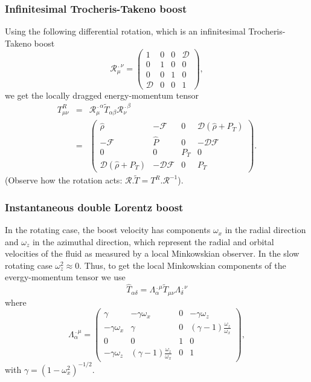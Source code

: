 \documentclass[twocolumn,superscriptaddress]{revtex4}
\begin{document}
\subsubsection{Infinitesimal Trocheris-Takeno boost}
Using the following differential rotation, which is
an infinitesimal Trocheris-Takeno boost
\begin{equation}
\mathcal{R}_\mu^{\,.\, \nu}=
\left(
\begin{array}{cccc}
 1 & 0  & 0 & \mathcal{D}\\
 0 & 1 & 0 & 0\\
 0 & 0  & 1 & 0 \\
 \mathcal{D} & 0 & 0 & 1
\end{array}
\right),
\label{old_rot}
\end{equation}
we get the locally dragged energy-momentum tensor
\begin{eqnarray}
T_{\mu\nu}^R&=&\mathcal{R}_\mu^{\,.\,\alpha} \tilde T_{\alpha\beta} \mathcal{R}_\nu^{\,.\,\beta}\nonumber\\
&=&\left(
\begin{array}{cccc}
 \hat\rho& -\mathcal{F}  & 0  &\mathcal{D}(\hat\rho+P_T)\\
 -\mathcal{F} & \hat P  & 0 & -\mathcal{D}\mathcal{F}\\
 0 & 0  & P_T& 0 \\
 \mathcal{D}(\hat\rho+P_T) &-\mathcal{D}\mathcal{F}& 0 &P_T
\end{array}
\right).
\end{eqnarray}
(Observe how the rotation acts: $\mathcal{R}.\tilde T=T^R.\mathcal{R}^{-1}$).
\subsubsection{Instantaneous double Lorentz boost}
In the rotating case, the boost velocity has components $\omega_x$ in the radial direction and $\omega_z$ in the azimuthal direction, which represent the radial and orbital velocities of the fluid as measured by a local Minkowskian observer. In the slow rotating case $\omega_z^2\approx 0$. Thus, to get the local Minkowskian components of the evergy-momentum tensor we use
\begin{equation}
\hat T_{\alpha\delta}=\Lambda_\alpha^{\,.\,\mu} \tilde T_{\mu\nu} \Lambda_\delta^{\,.\,\nu}
\end{equation}
where
\begin{equation}
\Lambda_\alpha^{\,.\,\mu}=
\left(
\begin{array}{cccc}
 \gamma & -\gamma\omega_x & 0 & -\gamma\omega_z\\
 -\gamma\omega_x & \gamma & 0 & (\gamma-1)\displaystyle{\frac{\omega_z}{\omega_x}}\\
 0 & 0  & 1 & 0 \\
 -\gamma\omega_z & (\gamma-1)\displaystyle{\frac{\omega_z}{\omega_x}} & 0 & 1
\end{array}
\right),
\end{equation}
with $\gamma=(1-\omega_x^2)^{-1/2}$.
\end{document}
